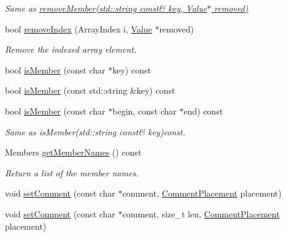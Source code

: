 \begin{DoxyCompactItemize}
\begin{DoxyCompactList}\small\item\em Same as \hyperlink{class_json_1_1_value_a3749dae413a73eac05b7f8dc6deeb6a2}{remove\+Member(std\+::string const\& key, Value$\ast$ removed)} \end{DoxyCompactList}\item 
bool \hyperlink{class_json_1_1_value_ae9e67e08a85a2f3be3396ec0f4c47f65}{remove\+Index} (Array\+Index i, \hyperlink{class_json_1_1_value}{Value} $\ast$removed)
\begin{DoxyCompactList}\small\item\em Remove the indexed array element. \end{DoxyCompactList}\item 
bool \hyperlink{class_json_1_1_value_a196defba501d70ea2b6793afb04108e3}{is\+Member} (const char $\ast$key) const 
\item 
bool \hyperlink{class_json_1_1_value_af728b5738aaa133f3aad2e39dc4f415e}{is\+Member} (const std\+::string \&key) const 
\item 
bool \hyperlink{class_json_1_1_value_a077604b87a79d75543a1b5438eb9d8ab}{is\+Member} (const char $\ast$begin, const char $\ast$end) const \hypertarget{class_json_1_1_value_a077604b87a79d75543a1b5438eb9d8ab}{}\label{class_json_1_1_value_a077604b87a79d75543a1b5438eb9d8ab}

\begin{DoxyCompactList}\small\item\em Same as is\+Member(std\+::string const\& key)const. \end{DoxyCompactList}\item 
Members \hyperlink{class_json_1_1_value_a30fa08af88f2d0a038b22ba9f4e88b2a}{get\+Member\+Names} () const 
\begin{DoxyCompactList}\small\item\em Return a list of the member names. \end{DoxyCompactList}\item 
void \hyperlink{class_json_1_1_value_a29f3a30f7e5d3af6f38d57999bf5b480}{set\+Comment} (const char $\ast$comment, \hyperlink{namespace_json_a4fc417c23905b2ae9e2c47d197a45351}{Comment\+Placement} placement)
\item 
void \hyperlink{class_json_1_1_value_a2900152a2887b410a9ddabe278b9d492}{set\+Comment} (const char $\ast$comment, size\+\_\+t len, \hyperlink{namespace_json_a4fc417c23905b2ae9e2c47d197a45351}{Comment\+Placement} placement)\hypertarget{class_json_1_1_value_a2900152a2887b410a9ddabe278b9d492}{}\label{class_json_1_1_value_a2900152a2887b410a9ddabe278b9d492}


\end{DoxyCompactItemize}
